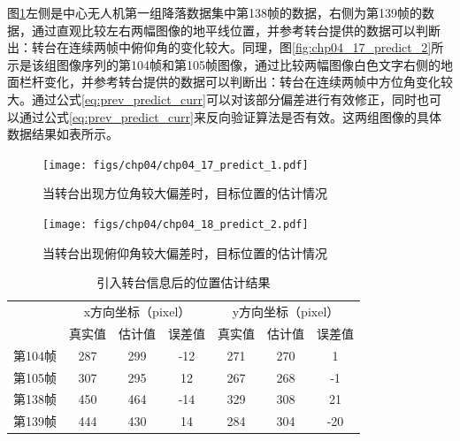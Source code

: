 图\ref{fig:chp04_17_predict_1}左侧是中心无人机第一组降落数据集中第138帧的数据，右侧为第139帧的数据，通过直观比较左右两幅图像的地平线位置，并参考转台提供的数据可以判断出：转台在连续两帧中俯仰角的变化较大。同理，图\ref{fig:chp04_17_predict_2}所示是该组图像序列的第104帧和第105帧图像，通过比较两幅图像白色文字右侧的地面栏杆变化，并参考转台提供的数据可以判断出：转台在连续两帧中方位角变化较大。通过公式\ref{eq:prev_predict_curr}可以对该部分偏差进行有效修正，同时也可以通过公式\ref{eq:prev_predict_curr}来反向验证算法是否有效。这两组图像的具体数据结果如表所示。

\begin{figure}[t]
	\centering
	\texttt{[image: figs/chp04/chp04\_17\_predict\_1.pdf]}
	\caption{当转台出现方位角较大偏差时，目标位置的估计情况}
	\label{fig:chp04_17_predict_1}
\end{figure}

\begin{figure}[ht]   
	\centering
	\texttt{[image: figs/chp04/chp04\_18\_predict\_2.pdf]}
	\caption{当转台出现俯仰角较大偏差时，目标位置的估计情况}
	\label{fig:chp04_18_predict_2}
\end{figure}

\begin{table}[]
	\centering
	\caption{引入转台信息后的位置估计结果}
	\label{my-label}
	\begin{tabular}{lccc|ccc}
		\hline
		& \multicolumn{3}{c|}{x方向坐标（pixel）}                         & \multicolumn{3}{c}{y方向坐标（pixel）}   \\ \cline{2-7} 
		& 真实值 & \multicolumn{1}{l}{估计值} & \multicolumn{1}{l|}{误差值} & 真实值 & 估计值 & \multicolumn{1}{l}{误差值} \\ \hline
		\multicolumn{1}{c}{第104帧} & 287 & 299                     & -12                      & 271 & 270 & 1                       \\
		\multicolumn{1}{c}{第105帧} & 307 & 295                     & 12                       & 267 & 268 & -1                      \\ \hline
		第138帧                     & 450 & 464                     & -14                      & 329 & 308 & 21                      \\
		第139帧                     & 444 & 430                     & 14                       & 284 & 304 & -20                     \\ \hline
	\end{tabular}
\end{table}

